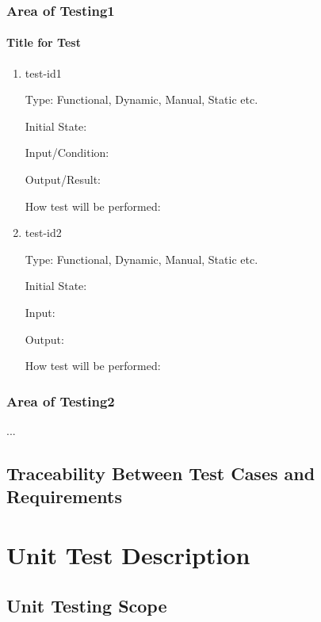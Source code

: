 \documentclass[12pt, titlepage]{article}
\begin{document}
\subsubsection{Area of Testing1}
		
\paragraph{Title for Test}

\begin{enumerate}

\item{test-id1\\}

Type: Functional, Dynamic, Manual, Static etc.
					
Initial State: 
					
Input/Condition: 
					
Output/Result: 
					
How test will be performed: 
					
\item{test-id2\\}

Type: Functional, Dynamic, Manual, Static etc.
					
Initial State: 
					
Input: 
					
Output: 
					
How test will be performed: 

\end{enumerate}

\subsubsection{Area of Testing2}

...

\subsection{Traceability Between Test Cases and Requirements}


\section{Unit Test Description}







\subsection{Unit Testing Scope}
\end{document}
